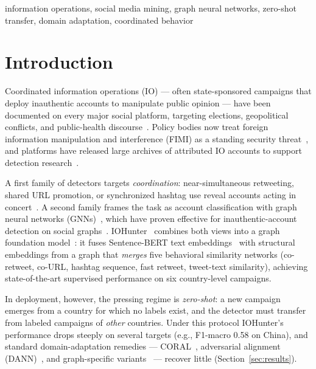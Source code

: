 \documentclass[conference]{IEEEtran}
\begin{document}
\begin{IEEEkeywords}
information operations, social media mining, graph neural networks,
zero-shot transfer, domain adaptation, coordinated behavior
\end{IEEEkeywords}

\section{Introduction}

Coordinated information operations (IO) --- often state-sponsored campaigns
that deploy inauthentic accounts to manipulate public opinion --- have been
documented on every major social platform, targeting elections, geopolitical
conflicts, and public-health discourse~\cite{ferrara2016rise,
zannettou2019disinformation, alizadeh2020content}. Policy bodies now treat
foreign information manipulation and interference (FIMI) as a standing
security threat~\cite{eeas2023fimi}, and platforms have released large
archives of attributed IO accounts to support detection
research~\cite{twitter2018enabling}.

A first family of detectors targets \emph{coordination}: near-simultaneous
retweeting, shared URL promotion, or synchronized hashtag use reveal accounts
acting in concert~\cite{pacheco2021uncovering, nizzoli2021coordinated,
sharma2021identifying, luceri2024unmasking}. A second family frames the task
as account classification with graph neural networks
(GNNs)~\cite{kipf2017gcn, velickovic2018gat, hamilton2017graphsage}, which
have proven effective for inauthentic-account detection on social
graphs~\cite{feng2021botrgcn}. IOHunter~\cite{minici2025iohunter} combines
both views into a graph foundation model~\cite{liu2023towards}: it fuses
Sentence-BERT text embeddings~\cite{reimers2019sbert} with structural
embeddings from a graph that \emph{merges} five behavioral similarity
networks (co-retweet, co-URL, hashtag sequence, fast retweet, tweet-text
similarity), achieving state-of-the-art supervised performance on six
country-level campaigns.

In deployment, however, the pressing regime is \emph{zero-shot}: a new
campaign emerges from a country for which no labels exist, and the detector
must transfer from labeled campaigns of \emph{other} countries. Under this
protocol IOHunter's performance drops steeply on several targets (e.g.,
F1-macro 0.58 on China), and standard domain-adaptation remedies ---
CORAL~\cite{sun2016coral}, adversarial alignment (DANN)~\cite{ganin2016dann},
and graph-specific variants~\cite{wu2020udagcn} --- recover little
(Section~\ref{sec:results}).
\end{document}
